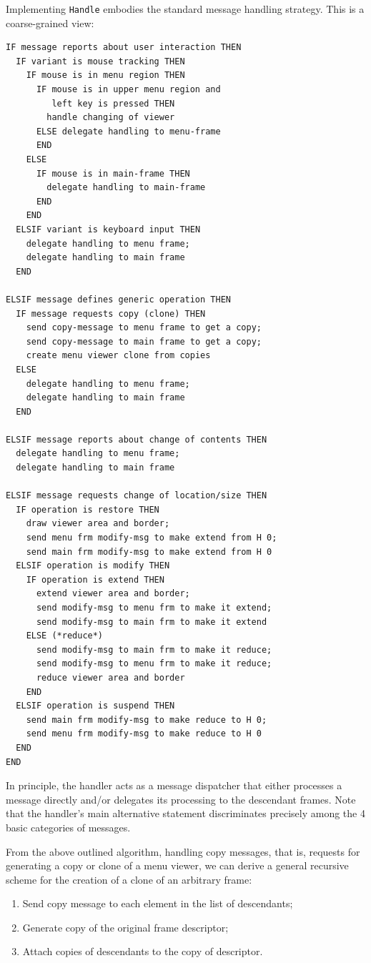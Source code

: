 Implementing \verb|Handle| embodies the standard message handling strategy.
This is a coarse-grained view:
\begin{verbatim}
IF message reports about user interaction THEN
  IF variant is mouse tracking THEN
    IF mouse is in menu region THEN
      IF mouse is in upper menu region and
         left key is pressed THEN
        handle changing of viewer
      ELSE delegate handling to menu-frame
      END
    ELSE
      IF mouse is in main-frame THEN
        delegate handling to main-frame
      END
    END
  ELSIF variant is keyboard input THEN
    delegate handling to menu frame;
    delegate handling to main frame
  END

ELSIF message defines generic operation THEN
  IF message requests copy (clone) THEN
    send copy-message to menu frame to get a copy;
    send copy-message to main frame to get a copy;
    create menu viewer clone from copies
  ELSE
    delegate handling to menu frame;
    delegate handling to main frame
  END

ELSIF message reports about change of contents THEN
  delegate handling to menu frame;
  delegate handling to main frame

ELSIF message requests change of location/size THEN
  IF operation is restore THEN
    draw viewer area and border;
    send menu frm modify-msg to make extend from H 0;
    send main frm modify-msg to make extend from H 0
  ELSIF operation is modify THEN
    IF operation is extend THEN
      extend viewer area and border;
      send modify-msg to menu frm to make it extend;
      send modify-msg to main frm to make it extend
    ELSE (*reduce*)
      send modify-msg to main frm to make it reduce;
      send modify-msg to menu frm to make it reduce;
      reduce viewer area and border
    END
  ELSIF operation is suspend THEN
    send main frm modify-msg to make reduce to H 0;
    send menu frm modify-msg to make reduce to H 0
  END
END
\end{verbatim}

In principle, the handler acts as a message dispatcher that either processes a message directly
and/or delegates its processing to the descendant frames. Note that the handler's main alternative
statement discriminates precisely among the 4 basic categories of messages.

From the above outlined algorithm, handling copy messages, that is, requests for generating
a copy or clone of a menu viewer, we can derive a general recursive scheme for the creation
of a clone of an arbitrary frame:
\begin{enumerate}
  \item Send copy message to each element in the list of descendants;
  \item Generate copy of the original frame descriptor;
  \item Attach copies of descendants to the copy of descriptor.
\end{enumerate}

